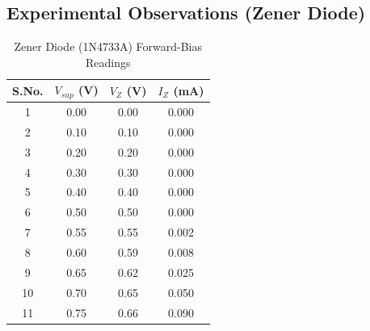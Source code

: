 \documentclass[11pt,a4paper]{article}
\begin{document}
\subsection{Experimental Observations (Zener Diode)}
\small
\begin{longtable}{c c c c}
\caption{Zener Diode (1N4733A) Forward-Bias Readings}\label{tab:zener_forward_readings}\\
\toprule
\textbf{S.No.} & $V_{sup}$ (V) & $V_Z$ (V) & $I_Z$ (mA) \\
\midrule
1 & 0.00 & 0.00 & 0.000\\
2 & 0.10 & 0.10 & 0.000\\
3 & 0.20 & 0.20 & 0.000\\
4 & 0.30 & 0.30 & 0.000\\
5 & 0.40 & 0.40 & 0.000\\
6 & 0.50 & 0.50 & 0.000\\
7 & 0.55 & 0.55 & 0.002\\
8 & 0.60 & 0.59 & 0.008\\
9 & 0.65 & 0.62 & 0.025\\
10 & 0.70 & 0.65 & 0.050\\
11 & 0.75 & 0.66 & 0.090\\
\bottomrule
\end{longtable}
\end{document}

